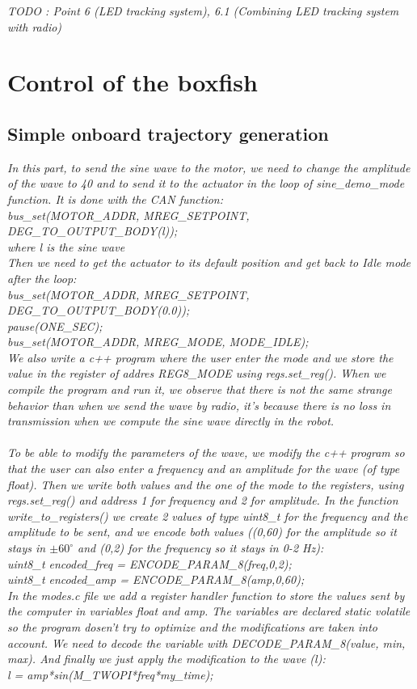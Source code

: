 \documentclass[11pt]{article}
\begin{document}
\textit{TODO : Point 6 (LED tracking system), 6.1 (Combining LED tracking system with radio)}

\section{Control of the boxfish}

\subsection{Simple onboard trajectory generation}

\textit{In this part, to send the sine wave to the motor, we need to change the amplitude of the wave to 40 and to send it to the actuator in the loop of sine\_demo\_mode function. It is done with the CAN function:
\\
bus\_set(MOTOR\_ADDR, MREG\_SETPOINT, DEG\_TO\_OUTPUT\_BODY(l));
\\
where l is the sine wave
\\
Then we need to get the actuator to its default position and get back to Idle mode after the loop:
\\
bus\_set(MOTOR\_ADDR, MREG\_SETPOINT, DEG\_TO\_OUTPUT\_BODY(0.0));
\\
pause(ONE\_SEC);
\\
bus\_set(MOTOR\_ADDR, MREG\_MODE, MODE\_IDLE);
\\
We also write a c++ program where the user enter the mode and we store the value in the register of addres REG8\_MODE using regs.set\_reg(). When we compile the program and run it, we observe that there is not the same strange behavior than when we send the wave by radio, it's because there is no loss in transmission when we compute the sine wave directly in the robot.
\\
\\
To be able to modify the parameters of the wave, we modify the c++ program so that the user can also enter a frequency and an amplitude for the wave (of type float). Then we write both values and the one of the mode to the registers, using regs.set\_reg() and address 1 for frequency and 2 for amplitude. In the function write\_to\_registers() we create 2 values of type uint8\_t for the frequency and the amplitude to be sent, and we encode both values ((0,60) for the amplitude so it stays in $\pm{60}^{\circ}$ and (0,2) for the frequency so it stays in 0-2 Hz):
\\
uint8\_t encoded\_freq = ENCODE\_PARAM\_8(freq,0,2);
\\
uint8\_t encoded\_amp = ENCODE\_PARAM\_8(amp,0,60);
\\
In the modes.c file we add a register handler function to store the values sent by the computer in variables float and amp. The variables are declared static volatile so the program dosen't try to optimize and the modifications are taken into account. We need to decode the variable with DECODE\_PARAM\_8(value, min, max). And finally we just apply the modification to the wave (l):
\\
l = amp*sin(M\_TWOPI*freq*my\_time);
}
\end{document}
